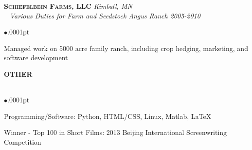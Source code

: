 \documentclass[11pt]{article}
\newcommand{\lineunder}{\vspace*{-8pt} \\ \hspace*{-18pt} \hrulefill \\}
\newcommand{\header}[1]{{\hspace*{-15pt}\vspace*{5pt} \Large \uppercase{\textbf{#1}}} \vspace*{-6pt} \lineunder \vspace*{0pt} }
\newcommand{\employer}[4]{{\hspace*{-20pt} {\small{\textbf{\textsc{ #1}}}} \hfill \small{\emph{#2}}\\ ~\hspace*{-20pt} \small \emph{ #3 \hfill #4}}\\ }
\newenvironment{achievements}{\begin{list}{$\bullet$}{\topsep .0001pt \itemsep -2pt}}{\vspace*{5pt}\end{list} }
\begin{document}


\employer{Schiefelbein Farms, LLC } {Kimball, MN} {Various Duties for Farm and Seedstock Angus Ranch} {2005-2010}\nopagebreak[4]
	\begin{achievements}
	\item 	Managed work on 5000 acre family ranch, including crop hedging, marketing, and software development
	\end{achievements}

\header{Other}
\vspace{-2pt}
\begin{achievements}
\item	Programming/Software: Python, HTML/CSS, Linux, Matlab, \LaTeX{}
\item  Winner - Top 100 in Short Films: 2013 Beijing International Screenwriting Competition




\end{achievements}
\end{document}
